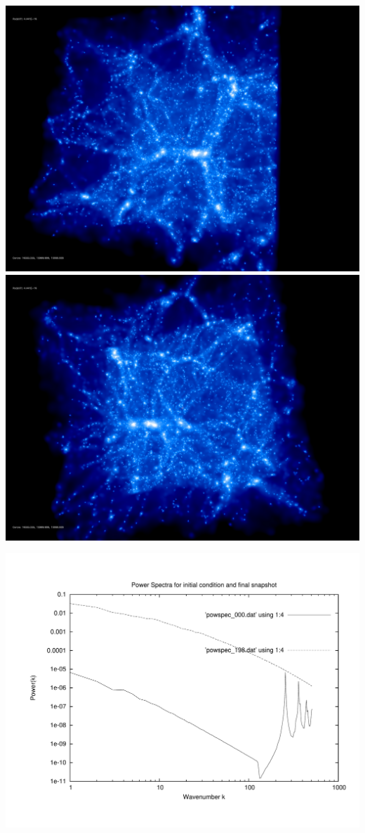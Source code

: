 \includegraphics[scale=0.1]{NGenIC_15039/rotate_00074.jpg} 
\includegraphics[scale=0.1]{NGenIC_15039/rotate_00131.jpg}

\includegraphics[scale=0.5]{NGenIC_15039/plot_powspec_NGenIC_15039}

